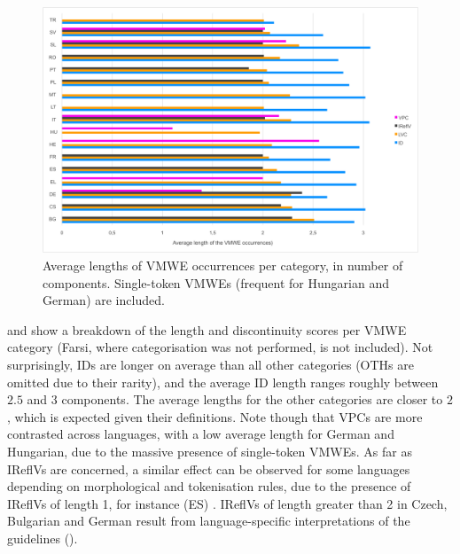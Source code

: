 \documentclass[output=paper,
modfonts,
]{langscibook}
\begin{document}
\begin{figure}
\centering
\includegraphics[width=1.0\textwidth]{figures/parseme-st-2017-BOOK-CORPUS-chart-length.png}
\caption{Average lengths of VMWE occurrences %
per category, %
in number of %
components. 
Single-token VMWEs (frequent for Hungarian and German) are included.} %
\label{fig:lengths-per-category}
\end{figure}

 and  show a breakdown of the length and discontinuity scores per VMWE category (Farsi, where categorisation was not performed, is not included). Not surprisingly, %
IDs are longer on average than all other categories (OTHs are omitted due to their rarity), and the average ID length ranges roughly between $2.5$ and $3$ components. The average lengths for the other categories are closer to $2$, which is expected given their definitions. Note though that VPCs are more contrasted across languages, with a low average length for German and Hungarian, due to the massive presence of single-token VMWEs. As far as IReflVs are concerned, a similar effect can be observed for some languages depending on morphological and tokenisation rules, due to the presence of IReflVs of length 1, for instance (ES) . IReflVs of length greater than 2 in Czech, Bulgarian and German result from language-specific interpretations of the guidelines ().
\end{document}
